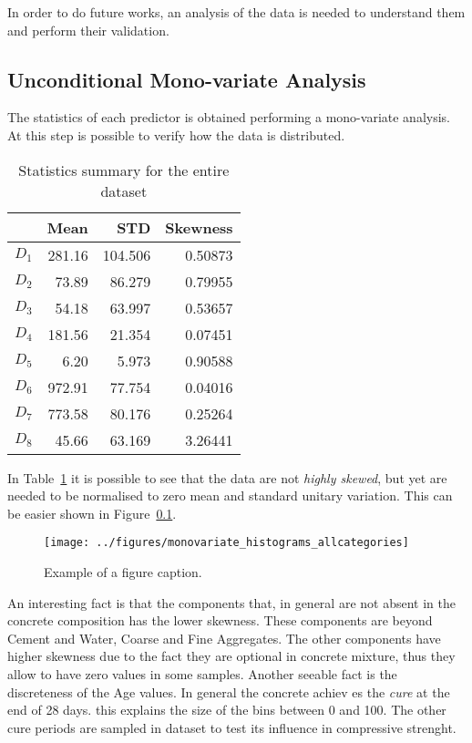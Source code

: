 \documentclass[conference]{IEEEtran}
\begin{document}
In order to do future works, an analysis of the data is needed to understand them and perform their validation.

\subsection{Unconditional Mono-variate Analysis}

The statistics of each predictor is obtained performing a mono-variate analysis. At this step is possible to verify how the data is distributed.

\begin{table}[htp]
\caption{Statistics summary for the entire dataset}
  \centering
  \begin{tabular}{@{} crrr @{}}
    \toprule
     & Mean & STD & Skewness \\ 
    \midrule
    $D_1$ & 281.16 & 104.506 & 0.50873 \\ 
    $D_2$ & 73.89 & 86.279 & 0.79955 \\ 
    $D_3$ & 54.18 & 63.997 & 0.53657 \\ 
    $D_4$ & 181.56 & 21.354 & 0.07451 \\ 
    $D_5$ & 6.20 & 5.973 & 0.90588 \\ 
    $D_6$ & 972.91 & 77.754 & 0.04016 \\ 
    $D_7$ & 773.58 & 80.176 & 0.25264 \\ 
    $D_8$ & 45.66 & 63.169 & 3.26441 \\       
    \bottomrule
  \end{tabular}
\label{Data Statistics Summary}
\end{table}%

In Table~\ref{Data Statistics Summary} it is possible to see that the data are not \emph{highly skewed}, but yet are needed to be normalised to zero mean and standard unitary variation. This can be easier shown in Figure~\ref{}.

\begin{figure}[htbp]
\centerline{\texttt{[image: ../figures/monovariate\_histograms\_allcategories]}}
\caption{Example of a figure caption.}
\label{fig}
\end{figure}

An interesting fact is that the components that, in general are not absent in the concrete composition has the lower skewness. These components are beyond Cement and Water, Coarse and Fine Aggregates. The other components have higher skewness due to the fact they are optional in concrete mixture, thus they allow to have zero values in some samples. Another seeable fact is the discreteness of the Age values. In general the concrete achiev
es the \emph{cure} at the end of 28 days. this explains the size of the bins between 0 and 100. The other cure periods are sampled in dataset to test its influence in compressive strenght.
\end{document}
